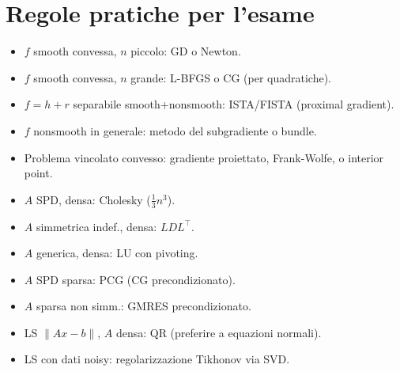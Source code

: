 \documentclass[11pt, a4paper, twoside]{book}
\theoremstyle{definition}
\theoremstyle{plain}
\theoremstyle{remark}
\begin{document}
\section{Regole pratiche per l'esame}

\begin{keybox}
\begin{itemize}
  \item $f$ smooth convessa, $n$ piccolo: GD o Newton.
  \item $f$ smooth convessa, $n$ grande: L-BFGS o CG (per quadratiche).
  \item $f = h + r$ separabile smooth+nonsmooth: ISTA/FISTA (proximal gradient).
  \item $f$ nonsmooth in generale: metodo del subgradiente o bundle.
  \item Problema vincolato convesso: gradiente proiettato, Frank-Wolfe, o interior point.
\end{itemize}
\end{keybox}

\begin{keybox}[Scelta del metodo per sistemi lineari $Ax = b$]
\begin{itemize}
  \item $A$ SPD, densa: Cholesky ($\frac{1}{3}n^3$).
  \item $A$ simmetrica indef., densa: $LDL^\top$.
  \item $A$ generica, densa: LU con pivoting.
  \item $A$ SPD sparsa: PCG (CG precondizionato).
  \item $A$ sparsa non simm.: GMRES precondizionato.
  \item LS $\|Ax - b\|$, $A$ densa: QR (preferire a equazioni normali).
  \item LS con dati noisy: regolarizzazione Tikhonov via SVD.
\end{itemize}
\end{keybox}

\backmatter
\end{document}
